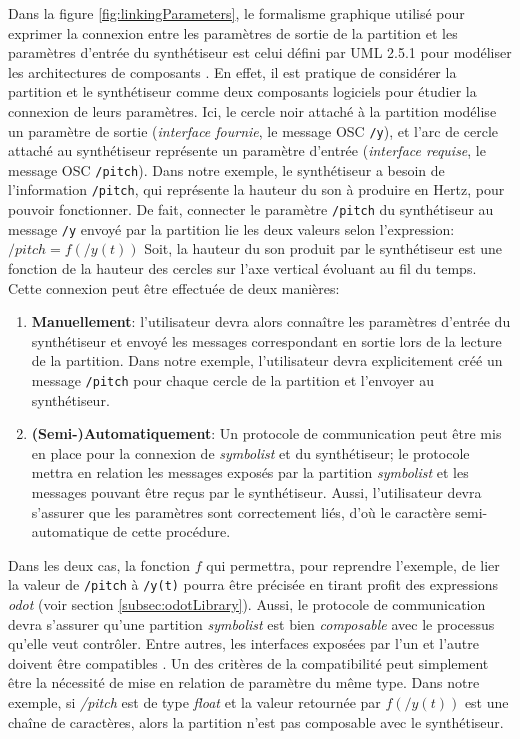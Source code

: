 Dans la figure \ref{fig:linkingParameters}, le formalisme graphique utilisé pour exprimer la connexion entre les paramètres de sortie de la partition et les paramètres d'entrée du synthétiseur est celui défini par UML 2.5.1 pour modéliser les architectures de composants \cite{omg2017}. En effet, il est pratique de considérer la partition et le synthétiseur comme deux composants logiciels pour étudier la connexion de leurs paramètres. Ici, le cercle noir attaché à la partition modélise un paramètre de sortie (\textit{interface fournie}, le message OSC \texttt{/y}), et l'arc de cercle attaché au synthétiseur représente un paramètre d'entrée (\textit{interface requise}, le message OSC \texttt{/pitch}).
Dans notre exemple, le synthétiseur a besoin de l'information \texttt{/pitch}, qui représente la hauteur du son à produire en Hertz, pour pouvoir fonctionner.
De fait, connecter le paramètre \texttt{/pitch} du synthétiseur au message \texttt{/y} envoyé par la partition lie les deux valeurs selon l'expression: $/pitch = f(/y(t))$
Soit, la hauteur du son produit par le synthétiseur est une fonction de la hauteur des cercles sur l'axe vertical évoluant au fil du temps. Cette connexion peut être effectuée de deux manières: 
\begin{enumerate}[label={(\arabic*)}]
	\item \textbf{Manuellement}: l'utilisateur devra alors connaître les paramètres d'entrée du synthétiseur et envoyé les messages correspondant en sortie lors de la lecture de la partition. Dans notre exemple, l'utilisateur devra explicitement créé un message \texttt{/pitch} pour chaque cercle de la partition et l'envoyer au synthétiseur.
	\item \textbf{(Semi-)Automatiquement}: Un protocole de communication peut être mis en place pour la connexion de \textit{symbolist} et du synthétiseur; le protocole mettra en relation les messages exposés par la partition \textit{symbolist} et les messages pouvant être reçus par le synthétiseur. Aussi, l'utilisateur devra s'assurer que les paramètres sont correctement liés, d'où le caractère semi-automatique de cette procédure. 
\end{enumerate}
%
Dans les deux cas, la fonction $f$ qui permettra, pour reprendre l'exemple, de lier la valeur de \texttt{/pitch} à \texttt{/y(t)} pourra être précisée en tirant profit des expressions \textit{odot} (voir section \ref{subsec:odotLibrary}).
Aussi, le protocole de communication devra s'assurer qu'une partition \textit{symbolist} est bien \textit{composable} avec le processus qu'elle veut contrôler. Entre autres, les interfaces exposées par l'un et l'autre doivent être compatibles \cite{chen2007}. Un des critères de la compatibilité peut simplement être la nécessité de mise en relation de paramètre du même type. Dans notre exemple, si \textit{/pitch} est de type \textit{float} et la valeur retournée par $f(/y(t))$ est une chaîne de caractères, alors la partition n'est pas composable avec le synthétiseur.

